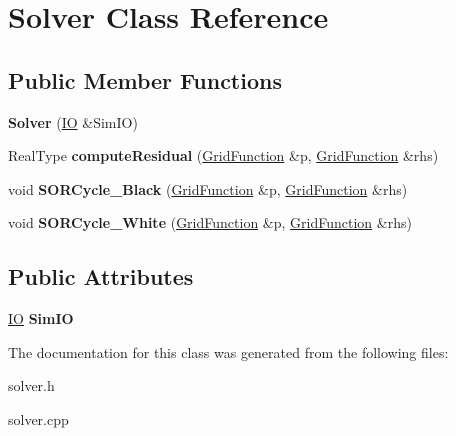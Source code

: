 \hypertarget{class_solver}{\section{Solver Class Reference}
\label{class_solver}
}
\subsection*{Public Member Functions}
\begin{DoxyCompactItemize}
\item 
\hypertarget{class_solver_a8f448f36eb78f0d594785ba55b1931ae}{{\bfseries Solver} (\hyperlink{class_i_o}{I\-O} \&Sim\-I\-O)}\label{class_solver_a8f448f36eb78f0d594785ba55b1931ae}

\item 
\hypertarget{class_solver_a877656cf33692bf590a40c9e17ab236d}{Real\-Type {\bfseries compute\-Residual} (\hyperlink{class_grid_function}{Grid\-Function} \&p, \hyperlink{class_grid_function}{Grid\-Function} \&rhs)}\label{class_solver_a877656cf33692bf590a40c9e17ab236d}

\item 
\hypertarget{class_solver_aa9a2e5e7cbf97effe18095a2b76d25b9}{void {\bfseries S\-O\-R\-Cycle\-\_\-\-Black} (\hyperlink{class_grid_function}{Grid\-Function} \&p, \hyperlink{class_grid_function}{Grid\-Function} \&rhs)}\label{class_solver_aa9a2e5e7cbf97effe18095a2b76d25b9}

\item 
\hypertarget{class_solver_a88b8db61a0f830d5e54ae5b6ade94893}{void {\bfseries S\-O\-R\-Cycle\-\_\-\-White} (\hyperlink{class_grid_function}{Grid\-Function} \&p, \hyperlink{class_grid_function}{Grid\-Function} \&rhs)}\label{class_solver_a88b8db61a0f830d5e54ae5b6ade94893}

\end{DoxyCompactItemize}
\subsection*{Public Attributes}
\begin{DoxyCompactItemize}
\item 
\hypertarget{class_solver_a86fe364d5209d6de59ac3edd8916818e}{\hyperlink{class_i_o}{I\-O} {\bfseries Sim\-I\-O}}\label{class_solver_a86fe364d5209d6de59ac3edd8916818e}

\end{DoxyCompactItemize}


The documentation for this class was generated from the following files\-:\begin{DoxyCompactItemize}
\item 
solver.\-h\item 
solver.\-cpp\end{DoxyCompactItemize}
